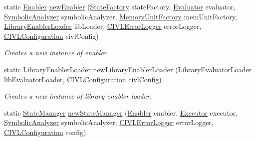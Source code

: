 \begin{DoxyCompactItemize}
\item 
static \hyperlink{interfaceedu_1_1udel_1_1cis_1_1vsl_1_1civl_1_1kripke_1_1IF_1_1Enabler}{Enabler} \hyperlink{classedu_1_1udel_1_1cis_1_1vsl_1_1civl_1_1kripke_1_1IF_1_1Kripkes_a8bdb7b7dbee331cb15867da62cd7ac12}{new\+Enabler} (\hyperlink{interfaceedu_1_1udel_1_1cis_1_1vsl_1_1civl_1_1state_1_1IF_1_1StateFactory}{State\+Factory} state\+Factory, \hyperlink{interfaceedu_1_1udel_1_1cis_1_1vsl_1_1civl_1_1semantics_1_1IF_1_1Evaluator}{Evaluator} evaluator, \hyperlink{interfaceedu_1_1udel_1_1cis_1_1vsl_1_1civl_1_1semantics_1_1IF_1_1SymbolicAnalyzer}{Symbolic\+Analyzer} symbolic\+Analyzer, \hyperlink{interfaceedu_1_1udel_1_1cis_1_1vsl_1_1civl_1_1state_1_1IF_1_1MemoryUnitFactory}{Memory\+Unit\+Factory} mem\+Unit\+Factory, \hyperlink{interfaceedu_1_1udel_1_1cis_1_1vsl_1_1civl_1_1kripke_1_1IF_1_1LibraryEnablerLoader}{Library\+Enabler\+Loader} lib\+Loader, \hyperlink{classedu_1_1udel_1_1cis_1_1vsl_1_1civl_1_1log_1_1IF_1_1CIVLErrorLogger}{C\+I\+V\+L\+Error\+Logger} error\+Logger, \hyperlink{classedu_1_1udel_1_1cis_1_1vsl_1_1civl_1_1config_1_1IF_1_1CIVLConfiguration}{C\+I\+V\+L\+Configuration} civl\+Config)
\begin{DoxyCompactList}\small\item\em Creates a new instance of enabler. \end{DoxyCompactList}\item 
static \hyperlink{interfaceedu_1_1udel_1_1cis_1_1vsl_1_1civl_1_1kripke_1_1IF_1_1LibraryEnablerLoader}{Library\+Enabler\+Loader} \hyperlink{classedu_1_1udel_1_1cis_1_1vsl_1_1civl_1_1kripke_1_1IF_1_1Kripkes_a66c2aa71c0a6fb994b2b64cc3ad842f1}{new\+Library\+Enabler\+Loader} (\hyperlink{interfaceedu_1_1udel_1_1cis_1_1vsl_1_1civl_1_1semantics_1_1IF_1_1LibraryEvaluatorLoader}{Library\+Evaluator\+Loader} lib\+Evaluator\+Loader, \hyperlink{classedu_1_1udel_1_1cis_1_1vsl_1_1civl_1_1config_1_1IF_1_1CIVLConfiguration}{C\+I\+V\+L\+Configuration} civl\+Config)
\begin{DoxyCompactList}\small\item\em Creates a new instance of library enabler loader. \end{DoxyCompactList}\item 
static \hyperlink{interfaceedu_1_1udel_1_1cis_1_1vsl_1_1civl_1_1kripke_1_1IF_1_1StateManager}{State\+Manager} \hyperlink{classedu_1_1udel_1_1cis_1_1vsl_1_1civl_1_1kripke_1_1IF_1_1Kripkes_a483cdcf31ed7b108c32385bbc6937d78}{new\+State\+Manager} (\hyperlink{interfaceedu_1_1udel_1_1cis_1_1vsl_1_1civl_1_1kripke_1_1IF_1_1Enabler}{Enabler} enabler, \hyperlink{interfaceedu_1_1udel_1_1cis_1_1vsl_1_1civl_1_1semantics_1_1IF_1_1Executor}{Executor} executor, \hyperlink{interfaceedu_1_1udel_1_1cis_1_1vsl_1_1civl_1_1semantics_1_1IF_1_1SymbolicAnalyzer}{Symbolic\+Analyzer} symbolic\+Analyzer, \hyperlink{classedu_1_1udel_1_1cis_1_1vsl_1_1civl_1_1log_1_1IF_1_1CIVLErrorLogger}{C\+I\+V\+L\+Error\+Logger} error\+Logger, \hyperlink{classedu_1_1udel_1_1cis_1_1vsl_1_1civl_1_1config_1_1IF_1_1CIVLConfiguration}{C\+I\+V\+L\+Configuration} config)

\end{DoxyCompactItemize}
